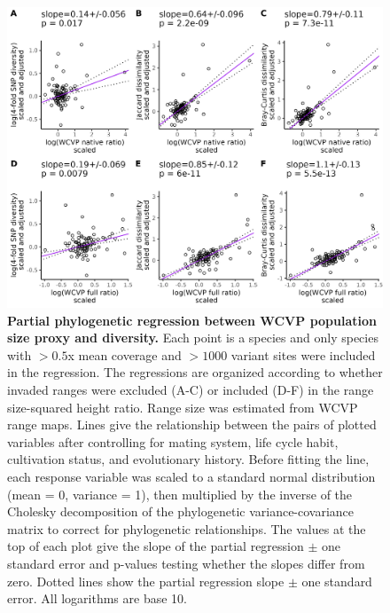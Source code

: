 \documentclass[12pt]{article}
\begin{document}
\begin{figure}[H]
    \centering
    \includegraphics[width=\textwidth]{figures/appendix_d/wcvp_popsize_vs_diversity_corrected_2024-12-12.jpg}
    \caption{\textbf{Partial phylogenetic regression between WCVP population size proxy and diversity.} Each point is a species and only species with $>0.5$x mean coverage and $>1000$ variant sites were included in the regression. The regressions are organized according to whether invaded ranges were excluded (A-C) or included (D-F) in the range size-squared height ratio. Range size was estimated from WCVP range maps. Lines give the relationship between the pairs of plotted variables after controlling for mating system, life cycle habit, cultivation status, and evolutionary history. Before fitting the line, each response variable was scaled to a standard normal distribution (mean = 0, variance = 1), then multiplied by the inverse of the Cholesky decomposition of the phylogenetic variance-covariance matrix to correct for phylogenetic relationships. The values at the top of each plot give the slope of the partial regression $\pm$ one standard error and p-values testing whether the slopes differ from zero. Dotted lines show the partial regression slope $\pm$ one standard error. All logarithms are base 10.}
\end{figure}
\end{document}
